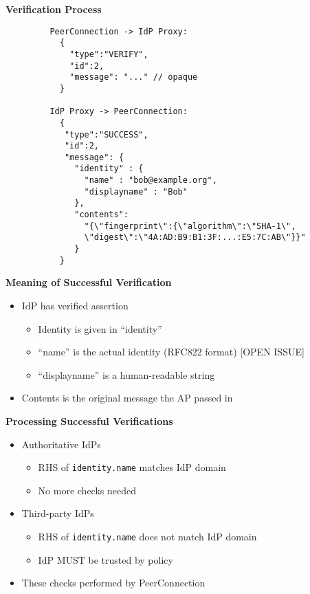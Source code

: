 \documentclass[helvetica]{seminar}
\newcommand{\heading}[1]{%
  \begin{center} 
    \large\bf 
    #1 
  \end{center} 
  \vspace{.4 in}}
\begin{document}
\begin{slide}
\heading{Verification Process}

\begin{tiny}
\begin{verbatim}
         PeerConnection -> IdP Proxy:
           {
             "type":"VERIFY",
             "id":2,
             "message": "..." // opaque
           }

         IdP Proxy -> PeerConnection:
           {
            "type":"SUCCESS",
            "id":2,
            "message": {
              "identity" : {
                "name" : "bob@example.org",
                "displayname" : "Bob"
              },
              "contents":
                "{\"fingerprint\":{\"algorithm\":\"SHA-1\",
                \"digest\":\"4A:AD:B9:B1:3F:...:E5:7C:AB\"}}"
              }
           }
\end{verbatim}
\end{tiny}
\end{slide}

\begin{slide}
\heading{Meaning of Successful Verification}

\begin{itemize}
\item IdP has verified assertion
  \begin{itemize}
  \item Identity is given in ``identity''
  \item ``name'' is the actual identity (RFC822 format) [OPEN ISSUE]
  \item ``displayname'' is a human-readable string
  \end{itemize}

\item Contents is the original message the AP passed in
\end{itemize}

\end{slide}


\begin{slide}
\heading{Processing Successful Verifications}

\begin{itemize}
\item Authoritative IdPs
  \begin{itemize}
  \item RHS of \verb^identity.name^ matches IdP domain
  \item No more checks needed
  \end{itemize}

\item Third-party IdPs
  \begin{itemize}
  \item RHS of \verb^identity.name^ does not match IdP domain
  \item IdP MUST be trusted by policy
  \end{itemize}

\item These checks performed by PeerConnection
\end{itemize}
\end{slide}
\end{document}
